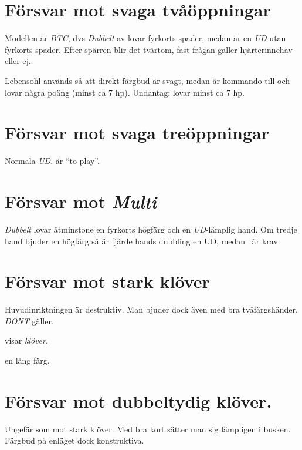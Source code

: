 \section{Försvar mot svaga två\-öpp\-ning\-ar}

Modellen är {\em BTC}, dvs {\em Dubbelt} av  lovar fyrkorts spader,
medan  är en {\em UD} utan fyrkorts spader. Efter spärren 
blir det tvärtom, fast frågan gäller hjärterinnehav eller ej.

Lebensohl används så att direkt färgbud är svagt, medan  är
kommando till  och lovar några poäng (minst ca 7 hp). Undantag:
 lovar minst ca 7 hp.

\section{Försvar mot svaga tre\-öpp\-ning\-ar}

Normala \emph{UD}.  är ``to play''.

\section{Försvar mot {\em Multi} }

{\em Dubbelt} lovar åtminstone en fyrkorts högfärg och en {\em
UD}-lämplig hand. Om tredje hand bjuder en högfärg så är fjärde hands
dubbling en UD, medan \pass\ är krav.

\section{Försvar mot stark klöver}

Huvudinriktningen  är destruktiv. Man bjuder dock även med bra
två\-färgs\-hän\-der. \emph{DONT} gäller.

\bbe
   \item[Dubbelt] visar \emph{klöver}.
   \item[\NT{1}] en lång färg.
\ebe

\section{Försvar mot dubbeltydig klöver.}

Ungefär som mot stark klöver. Med bra kort sätter man sig lämpligen i
busken. Färgbud på enläget dock konstruktiva.

